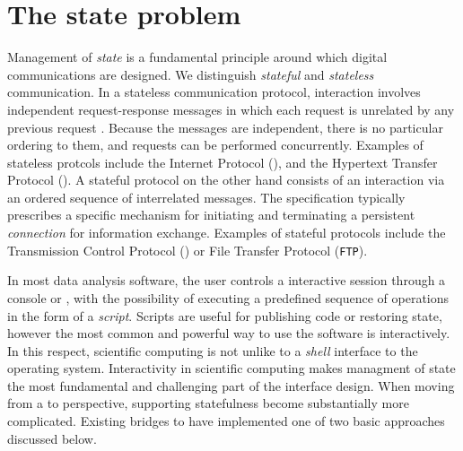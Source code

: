 \section{The state problem}

Management of \emph{state} is a fundamental principle around which digital communications are designed. We distinguish \emph{stateful} and \emph{stateless} communication. In a stateless communication protocol, interaction involves independent request-response messages in which each request is unrelated by any previous request \citep{hennessy2012computer}. Because the messages are independent, there is no particular ordering to them, and requests can be performed concurrently. Examples of stateless protcols include the Internet Protocol (\IP), and the Hypertext Transfer Protocol (\HTTP). A stateful protocol on the other hand consists of an interaction via an ordered sequence of interrelated messages. The specification typically prescribes a specific mechanism for initiating and terminating a persistent \emph{connection} for information exchange. Examples of stateful protocols include the Transmission Control Protocol (\TCP) or File Transfer Protocol (\texttt{FTP}).


In most data analysis software, the user controls a interactive session through a console or \GUI, with the possibility of executing a predefined sequence of operations in the form of a \emph{script}. Scripts are useful for publishing code or restoring state, however the most common and powerful way to use the software is interactively. In this respect, scientific computing is not unlike to a \emph{shell} interface to the operating system. Interactivity in scientific computing makes managment of state the most fundamental and challenging part of the interface design. When moving from a \UI to \API perspective, supporting statefulness become substantially more complicated. Existing bridges to \R have implemented one of two basic approaches discussed below. 

